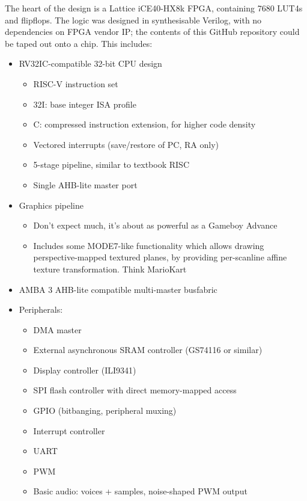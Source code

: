 \documentclass{article}
\begin{document}
The heart of the design is a Lattice iCE40-HX8k FPGA, containing 7680 LUT4s and flipflops. The logic was designed in synthesisable Verilog, with no dependencies on FPGA vendor IP; the contents of this GitHub repository could be taped out onto a chip. This includes:

\begin{itemize}
\item RV32IC-compatible 32-bit CPU design
	\begin{itemize}
	\item RISC-V instruction set
	\item 32I: base integer ISA profile
	\item C: compressed instruction extension, for higher code density
	\item Vectored interrupts (save/restore of PC, RA only)
	\item 5-stage pipeline, similar to textbook RISC
	\item Single AHB-lite master port
	\end{itemize}
\item Graphics pipeline
	\begin{itemize}
	\item Don't expect much, it's about as powerful as a Gameboy Advance
	\item Includes some MODE7-like functionality which allows drawing perspective-mapped textured planes, by providing per-scanline affine texture transformation. Think MarioKart
	\end{itemize}
\item AMBA 3 AHB-lite compatible multi-master busfabric
\item Peripherals:
	\begin{itemize}
	\item DMA master
	\item External asynchronous SRAM controller (GS74116 or similar)
	\item Display controller (ILI9341)
	\item SPI flash controller with direct memory-mapped access
	\item GPIO (bitbanging, peripheral muxing)
	\item Interrupt controller
	\item UART
	\item PWM
	\item Basic audio: voices + samples, noise-shaped PWM output
	\end{itemize}
\end{itemize}
\end{document}
